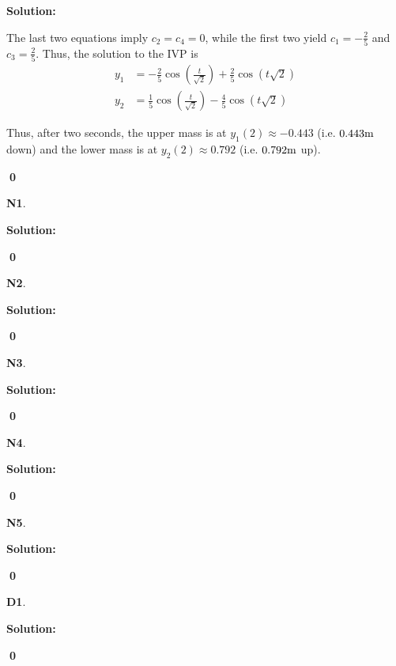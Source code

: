 \documentclass{article}
\newenvironment{problem}[1]
{
  \begin{flushleft}
  \textbf{#1}.
  \ignorespaces
}
{
  \end{flushleft}
}
\newenvironment{solution}
{
  \ignorespaces
  \textbf{Solution:}
}
{
  \ignorespacesafterend
  \begin{flushright}
  {\bfseries \qed}
  \end{flushright}
}
\begin{document}
\begin{solution}
The last two equations imply \(c_2=c_4=0\), while the first two yield \(c_1=-\frac{2}{5}\) and \(c_3 = \frac{2}{5}\).  Thus, the solution to the IVP is
\begin{align*}
y_1 &= -\frac{2}{5} \cos\left(\frac{t}{\sqrt{2}}\right)+\frac{2}{5}\cos\left(t\sqrt{2}\right) \\
y_2 &= \frac{1}{5} \cos\left(\frac{t}{\sqrt{2}}\right)-\frac{4}{5} \cos\left(t\sqrt{2}\right)
\end{align*}

Thus, after two seconds, the upper mass is at \(y_1(2) \approx -0.443\) (i.e. \(0.443 {\rm m}\) down) and the lower mass is at \(y_2(2) \approx 0.792\) (i.e. \(0.792 {\rm m}\) up).
\end{solution}


\begin{problem}{N1}

\end{problem}
\begin{solution}

\end{solution}

\begin{problem}{N2}

\end{problem}
\begin{solution}

\end{solution}

\begin{problem}{N3}

\end{problem}
\begin{solution}

\end{solution}

\begin{problem}{N4}

\end{problem}
\begin{solution}

\end{solution}

\begin{problem}{N5}

\end{problem}
\begin{solution}

\end{solution}


\begin{problem}{D1}

\end{problem}
\begin{solution}

\end{solution}
\end{document}
